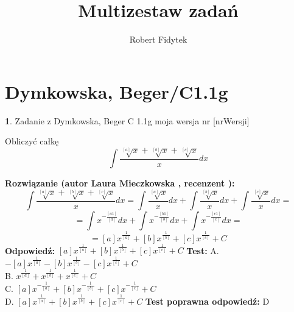 \documentclass[12pt, a4paper]{article}
\title{Multizestaw zadań}
\author{Robert Fidytek}
\date{}
\theoremstyle{definition} %
\newtheorem{zad}{}
\newcommand{\kategoria}[1]{\section{#1}} %
\newcommand{\zadStart}[1]{\begin{zad}#1\newline} %
\newcommand{\zadStop}{\end{zad}}   %
\newcommand{\rozwStart}[2]{\noindent \textbf{Rozwiązanie (autor #1 , recenzent #2): }\newline} %
\newcommand{\rozwStop}{\newline}                                            %
\newcommand{\odpStart}{\noindent \textbf{Odpowiedź:}\newline}    %
\newcommand{\odpStop}{\newline}                                             %
\newcommand{\testStart}{\noindent \textbf{Test:}\newline} %
\newcommand{\testStop}{\newline} %
\newcommand{\kluczStart}{\noindent \textbf{Test poprawna odpowiedź:}\newline} %
\newcommand{\kluczStop}{\newline} %
\begin{document}
\maketitle


\kategoria{Dymkowska, Beger/C1.1g}
\zadStart{Zadanie z Dymkowska, Beger C 1.1g  moja wersja nr [nrWersji]}

Obliczyć całkę $$\int \frac{\sqrt[{[a]}]{x}+\sqrt[{[b]}]{x}+\sqrt[{[c]}]{x}}{x}dx$$
\zadStop
\rozwStart{Laura Mieczkowska}{}
$$\int \frac{\sqrt[{[a]}]{x}+\sqrt[{[b]}]{x}+\sqrt[{[c]}]{x}}{x}dx=\int\frac{\sqrt[{[a]}]{x}}{x}dx+\int\frac{\sqrt[{[b]}]{x}}{x}dx+\int\frac{\sqrt[{[c]}]{x}}{x}dx=$$
$$=\int x^{-\frac{[a1]}{[a]}}dx+\int x^{-\frac{[b1]}{[b]}}dx+\int x^{-\frac{[c1]}{[c]}}dx=$$
$$=[a]x^{\frac{1}{[a]}}+[b]x^{\frac{1}{[b]}}+[c]x^{\frac{1}{[c]}}+C$$
\rozwStop
\odpStart
$[a]x^{\frac{1}{[a]}}+[b]x^{\frac{1}{[b]}}+[c]x^{\frac{1}{[c]}}+C$
\odpStop
\testStart
A. $-[a]x^{\frac{1}{[a]}}-[b]x^{\frac{1}{[b]}}-[c]x^{\frac{1}{[c]}}+C$ \\
B. $x^{\frac{1}{[a]}}+x^{\frac{1}{[b]}}+x^{\frac{1}{[c]}}+C$ \\
C. $[a]x^{-\frac{1}{[a]}}+[b]x^{-\frac{1}{[b]}}+[c]x^{-\frac{1}{[c]}}+C$ \\
D. $[a]x^{\frac{1}{[a]}}+[b]x^{\frac{1}{[b]}}+[c]x^{\frac{1}{[c]}}+C$
\testStop
\kluczStart
D
\kluczStop
\end{document}
